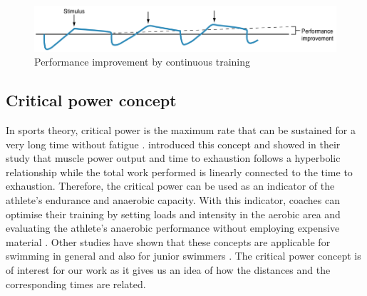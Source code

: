 \begin{figure}[ht]
    \centering
    \includegraphics[scale=0.5]{visualisation/training_improvement.png}
    \caption{Performance improvement by continuous training \cite{Bompa.2018.compensation}}
    \label{fig:training_improvement}
\end{figure}
\subsection{Critical power concept} \label{critical_power}
In sports theory, critical power is the maximum rate that can be sustained for a very long time without fatigue \cite{Monod.1965,Hill.1993}. \citet{Monod.1965} introduced this concept and showed in their study that muscle power output and time to exhaustion follows a hyperbolic relationship while the total work performed is linearly connected to the time to exhaustion. Therefore, the critical power can be used as an indicator of the athlete's endurance and anaerobic capacity. With this indicator, coaches can optimise their training by setting loads and intensity in the aerobic area and evaluating the athlete's anaerobic performance without employing expensive material \cite{Dekerle.2002}. Other studies have shown that these concepts are applicable for swimming in general \cite{Wakayoshi.1992} and also for junior swimmers \cite{Hill.1995}. The critical power concept is of interest for our work as it gives us an idea of how the distances and the corresponding times are related.
